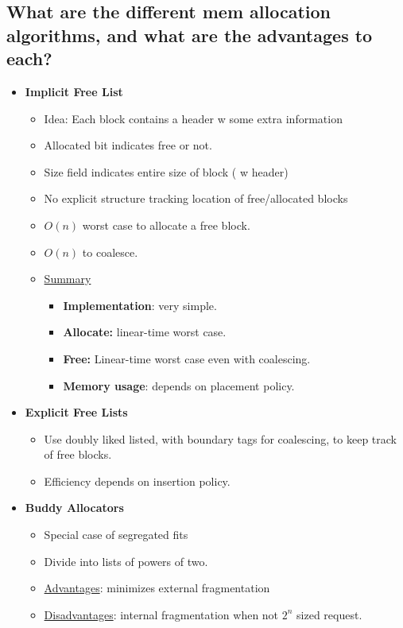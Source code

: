 \documentclass[a4paper]{article}
\begin{document}
\subsection{What are the different mem allocation algorithms, and what are the advantages to each?} %
\label{sub:What are the ≠ mem allocation algorithms, and what are the advantages to each?}
\begin{itemize}
  \item {\bf Implicit Free List}
    \begin{itemize}
      \item Idea: Each block contains a header w some extra information
      \item Allocated bit indicates free or not.
      \item Size field indicates entire size of block ( w header)
      \item No explicit structure tracking location of free/allocated blocks
      \item $O(n)$ worst case to allocate a free block.
      \item $O(n)$ to coalesce.
      \item \underline{Summary}
        \begin{itemize}
          \item {\bf Implementation}: very simple.
          \item {\bf Allocate:} linear-time worst case.
          \item {\bf Free:} Linear-time worst case even with coalescing.
          \item {\bf Memory usage}: depends on placement policy.
        \end{itemize}
    \end{itemize}

  \item {\bf Explicit Free Lists}
    \begin{itemize}
      \item Use doubly liked listed, with boundary tags for coalescing, to keep track of free blocks.
      \item Efficiency depends on insertion policy.
    \end{itemize}
  \item {\bf Buddy Allocators}
    \begin{itemize}
      \item Special case of segregated fits
      \item Divide into lists of powers of two.
      \item \underline{Advantages}: minimizes external fragmentation
      \item \underline{Disadvantages}: internal fragmentation when not $2^{n}$ sized request.
    \end{itemize}
\end{itemize}
\end{document}
